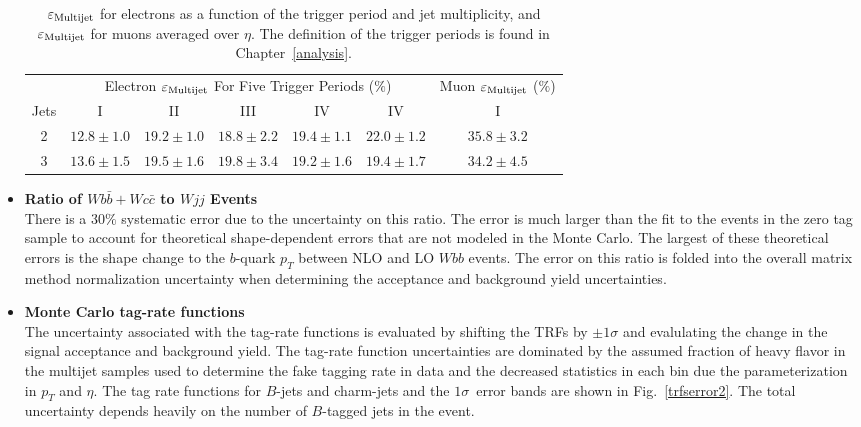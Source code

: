 \begin{itemize}
\begin{table}[!h!tbp]
\begin{center}
\caption{$\varepsilon_{\rm{Multijet}}$ for electrons as a function of
the trigger period and jet multiplicity, and $\varepsilon_{\rm{Multijet}}$ for muons averaged over $\eta$. The definition of the trigger periods is found in Chapter~\ref{analysis}.}
\label{eps-qcd}
\begin{tabular}{c|ccccc|c}
& \multicolumn{5}{c|}{ Electron $\varepsilon_{\rm{Multijet}}$ For Five Trigger Periods ($\%$)} & \multicolumn{1}{c}{ Muon $\varepsilon_{\rm{Multijet}}$  ($\%$)} \\
Jets & I   &     II     &     III    &     IV    &     IV     &     I \\
\hline 
 2 & $12.8 \pm 1.0$ & $19.2 \pm 1.0$ & $18.8 \pm 2.2$ & $19.4 \pm 1.1$ & $22.0 \pm 1.2$ & $35.8 \pm 3.2$ \\
 3 & $13.6 \pm 1.5$ & $19.5 \pm 1.6$ & $19.8 \pm 3.4$ & $19.2 \pm 1.6$ & $19.4 \pm 1.7$ & $34.2 \pm 4.5$ \\
\end{tabular}
\vspace{-0.1in}
\end{center}
\end{table}


\item {\bf Ratio of $Wb\bar{b}+Wc\bar{c}$ to $Wjj$ Events} \\
There is a $30\%$ systematic error due to the uncertainty on this ratio. The error is much larger than the fit to the events in the zero tag sample to account for theoretical shape-dependent errors that are not modeled in the Monte Carlo. The largest of these theoretical errors is the shape change to the $b$-quark $p_{T}$ between NLO and LO $Wbb$ events. The error on this ratio is folded into the overall matrix method normalization uncertainty when determining the acceptance and background yield uncertainties.

\item {\bf Monte Carlo tag-rate functions}\\
The uncertainty associated with the tag-rate functions is evaluated by shifting the TRFs by $\pm1\sigma$ and evalulating the change in the signal acceptance and background yield. The tag-rate function uncertainties are dominated by the assumed fraction of heavy flavor in the multijet samples used to determine the fake tagging rate in data and the decreased statistics in each bin due the parameterization in $p_{T}$ and $\eta$. The tag rate functions for $B$-jets and charm-jets and the $1\sigma$~error bands are shown in Fig.~\ref{trfserror2}. The total uncertainty depends heavily on the number of $B$-tagged jets in the event.



\end{itemize}
